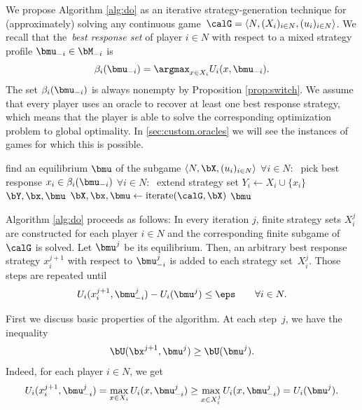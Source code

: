 We propose Algorithm \ref{alg:do} as an iterative strategy-generation technique for (approximately) solving any continuous game~$\calG=\langle N,(X_i)_{i\in N},(u_i)_{i\in N}\rangle$. We recall that the~\emph{best response set} of player $i\in N$ with respect to a mixed strategy profile $\bmu_{-i}\in \bM_{-i}$ is
\[
\beta_i(\bmu_{-i}) =  \argmax_{x\in X_i} U_i(x,\bmu_{-i}).
\]
The set $\beta_i(\bmu_{-i})$ is always nonempty by Proposition \ref{prop:switch}. We assume that every player uses an oracle to recover at least one best response strategy, which means that the player is able to solve the corresponding optimization problem to global optimality. In \cref{sec:custom.oracles} we will see the instances of games for which this is possible.

\begin{algorithm}
	\caption{The Multiple Oracle algorithm}
	\label{alg:do}
	\begin{algorithmic}
			\State find an equilibrium $\bmu$ of the subgame $\langle N,\bX,(u_i)_{i\in N}\rangle$
			\State $\forall i \in N:\;$ pick best response $x_i\in \beta_i(\bmu_{-i})$
			\State $\forall i \in N:\;$ extend strategy set $Y_i \gets X_i \cup \{x_i\}$
			\State \Return $\bY, \bx, \bmu$
		\EndFunction
			\Repeat
				\State $\bX, \bx, \bmu \gets \text{iterate}(\calG, \bX)$
			\State \Return $\bmu$
		\EndFunction
	\end{algorithmic}
\end{algorithm}

Algorithm \ref{alg:do} proceeds as follows: In every iteration $j$, finite strategy sets $X_i^j$ are constructed for each player $i\in N$ and the corresponding finite subgame of $\calG$ is solved. Let $\bmu^j$ be its equilibrium. Then, an arbitrary best response strategy $x_i^{j+1}$ with respect to $\bmu_{-i}^{j}$ is added to each strategy set~$X_i^j$. Those steps are repeated until
\begin{equation}\label{def:diff}
	U_i(x_i^{j+1},\bmu_{-i}^j)-U_i(\bmu^j)\leq \eps \qquad \forall i\in N.
\end{equation}

First we discuss basic properties of the algorithm.  At each step~$j$, we have the inequality
\begin{equation}\label{ineq:upper}
	\bU(\bx^{j+1},\bmu^j)\ge \bU(\bmu^j).
\end{equation}
Indeed, for each player $i\in N$, we get
\[
	U_i(x_i^{j+1},\bmu_{-i}^j) = \max_{x \in X_i} U_i(x,\bmu^j_{-i}) \ge \max_{x \in X_i^j} U_i(x,\bmu^j_{-i}) = U_i(\bmu^j).
\]

